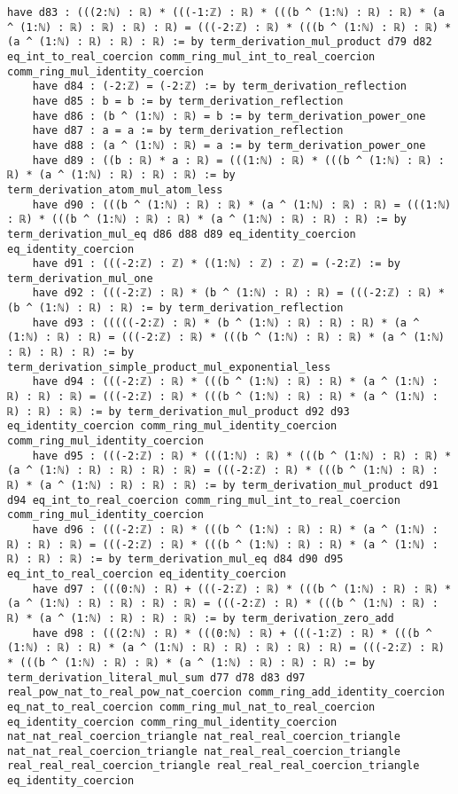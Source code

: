 \documentclass{article}
\begin{document}
\begin{tcolorbox}[colback=white!10, width=\linewidth]
\begin{lstlisting}[language=Lean4]
    have d83 : (((2:ℕ) : ℝ) * (((-1:ℤ) : ℝ) * (((b ^ (1:ℕ) : ℝ) : ℝ) * (a ^ (1:ℕ) : ℝ) : ℝ) : ℝ) : ℝ) = (((-2:ℤ) : ℝ) * (((b ^ (1:ℕ) : ℝ) : ℝ) * (a ^ (1:ℕ) : ℝ) : ℝ) : ℝ) := by term_derivation_mul_product d79 d82 eq_int_to_real_coercion comm_ring_mul_int_to_real_coercion comm_ring_mul_identity_coercion
    have d84 : (-2:ℤ) = (-2:ℤ) := by term_derivation_reflection
    have d85 : b = b := by term_derivation_reflection
    have d86 : (b ^ (1:ℕ) : ℝ) = b := by term_derivation_power_one
    have d87 : a = a := by term_derivation_reflection
    have d88 : (a ^ (1:ℕ) : ℝ) = a := by term_derivation_power_one
    have d89 : ((b : ℝ) * a : ℝ) = (((1:ℕ) : ℝ) * (((b ^ (1:ℕ) : ℝ) : ℝ) * (a ^ (1:ℕ) : ℝ) : ℝ) : ℝ) := by term_derivation_atom_mul_atom_less
    have d90 : (((b ^ (1:ℕ) : ℝ) : ℝ) * (a ^ (1:ℕ) : ℝ) : ℝ) = (((1:ℕ) : ℝ) * (((b ^ (1:ℕ) : ℝ) : ℝ) * (a ^ (1:ℕ) : ℝ) : ℝ) : ℝ) := by term_derivation_mul_eq d86 d88 d89 eq_identity_coercion eq_identity_coercion
    have d91 : (((-2:ℤ) : ℤ) * ((1:ℕ) : ℤ) : ℤ) = (-2:ℤ) := by term_derivation_mul_one
    have d92 : (((-2:ℤ) : ℝ) * (b ^ (1:ℕ) : ℝ) : ℝ) = (((-2:ℤ) : ℝ) * (b ^ (1:ℕ) : ℝ) : ℝ) := by term_derivation_reflection
    have d93 : (((((-2:ℤ) : ℝ) * (b ^ (1:ℕ) : ℝ) : ℝ) : ℝ) * (a ^ (1:ℕ) : ℝ) : ℝ) = (((-2:ℤ) : ℝ) * (((b ^ (1:ℕ) : ℝ) : ℝ) * (a ^ (1:ℕ) : ℝ) : ℝ) : ℝ) := by term_derivation_simple_product_mul_exponential_less
    have d94 : (((-2:ℤ) : ℝ) * (((b ^ (1:ℕ) : ℝ) : ℝ) * (a ^ (1:ℕ) : ℝ) : ℝ) : ℝ) = (((-2:ℤ) : ℝ) * (((b ^ (1:ℕ) : ℝ) : ℝ) * (a ^ (1:ℕ) : ℝ) : ℝ) : ℝ) := by term_derivation_mul_product d92 d93 eq_identity_coercion comm_ring_mul_identity_coercion comm_ring_mul_identity_coercion
    have d95 : (((-2:ℤ) : ℝ) * (((1:ℕ) : ℝ) * (((b ^ (1:ℕ) : ℝ) : ℝ) * (a ^ (1:ℕ) : ℝ) : ℝ) : ℝ) : ℝ) = (((-2:ℤ) : ℝ) * (((b ^ (1:ℕ) : ℝ) : ℝ) * (a ^ (1:ℕ) : ℝ) : ℝ) : ℝ) := by term_derivation_mul_product d91 d94 eq_int_to_real_coercion comm_ring_mul_int_to_real_coercion comm_ring_mul_identity_coercion
    have d96 : (((-2:ℤ) : ℝ) * (((b ^ (1:ℕ) : ℝ) : ℝ) * (a ^ (1:ℕ) : ℝ) : ℝ) : ℝ) = (((-2:ℤ) : ℝ) * (((b ^ (1:ℕ) : ℝ) : ℝ) * (a ^ (1:ℕ) : ℝ) : ℝ) : ℝ) := by term_derivation_mul_eq d84 d90 d95 eq_int_to_real_coercion eq_identity_coercion
    have d97 : (((0:ℕ) : ℝ) + (((-2:ℤ) : ℝ) * (((b ^ (1:ℕ) : ℝ) : ℝ) * (a ^ (1:ℕ) : ℝ) : ℝ) : ℝ) : ℝ) = (((-2:ℤ) : ℝ) * (((b ^ (1:ℕ) : ℝ) : ℝ) * (a ^ (1:ℕ) : ℝ) : ℝ) : ℝ) := by term_derivation_zero_add
    have d98 : (((2:ℕ) : ℝ) * (((0:ℕ) : ℝ) + (((-1:ℤ) : ℝ) * (((b ^ (1:ℕ) : ℝ) : ℝ) * (a ^ (1:ℕ) : ℝ) : ℝ) : ℝ) : ℝ) : ℝ) = (((-2:ℤ) : ℝ) * (((b ^ (1:ℕ) : ℝ) : ℝ) * (a ^ (1:ℕ) : ℝ) : ℝ) : ℝ) := by term_derivation_literal_mul_sum d77 d78 d83 d97 real_pow_nat_to_real_pow_nat_coercion comm_ring_add_identity_coercion eq_nat_to_real_coercion comm_ring_mul_nat_to_real_coercion eq_identity_coercion comm_ring_mul_identity_coercion nat_nat_real_coercion_triangle nat_real_real_coercion_triangle nat_nat_real_coercion_triangle nat_real_real_coercion_triangle real_real_real_coercion_triangle real_real_real_coercion_triangle eq_identity_coercion

\end{lstlisting}
\end{tcolorbox}
\end{document}
